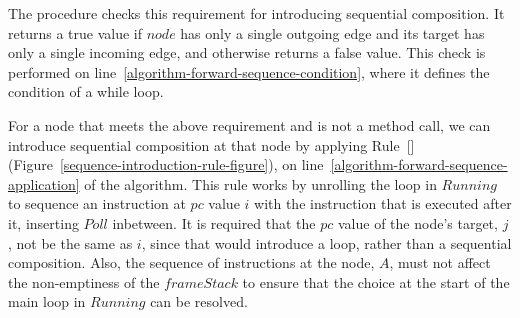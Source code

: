 The procedure  checks this requirement
for introducing sequential composition.
It returns a true value if $node$ has only a single outgoing edge and
its target has only a single incoming edge, and otherwise returns a
false value.
This check is performed on
line~\ref{algorithm-forward-sequence-condition}, where it defines the
condition of a while loop.

For a node that meets the above requirement and is not a method call,
we can introduce sequential composition at that node by applying
Rule~[]
(Figure~\ref{sequence-introduction-rule-figure}), on
line~\ref{algorithm-forward-sequence-application} of the algorithm.
This rule works by unrolling the loop in $Running$ to sequence an
instruction at $pc$ value $i$ with the instruction that is executed
after it, inserting $Poll$ inbetween.
It is required that the $pc$ value of the node's target, $j$, not be
the same as $i$, since that would introduce a loop, rather than a
sequential composition.
Also, the sequence of instructions at the node, $A$, must not affect
the non-emptiness of the $frameStack$ to ensure that the choice at the
start of the main loop in $Running$ can be resolved.
